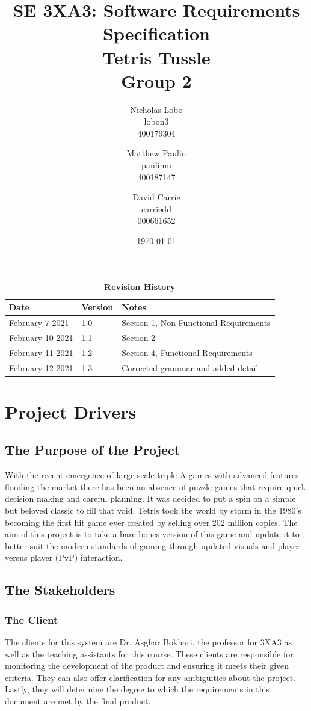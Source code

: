 \documentclass[12pt, titlepage]{article}
\title{\textbf{SE 3XA3: Software Requirements Specification} \\
    \large{Tetris Tussle \\ Group 2}
}
\author{
    Nicholas Lobo \\ lobon3 \\ 400179304 \and
	Matthew Paulin \\ paulinm \\ 400187147 \and
	David Carrie \\ carriedd \\ 000661652 \and
}
\date{\today}
\begin{document}
\maketitle

\tableofcontents
\listoftables
\listoffigures

\begin{table}[!ht]
\caption{\bf Revision History}
\begin{tabularx}{\textwidth}{p{3cm}p{2cm}X}
\toprule {\bf Date} & {\bf Version} & {\bf Notes}\\
\midrule
February 7 2021 & 1.0 & Section 1, Non-Functional Requirements\\
February 10 2021 & 1.1 & Section 2\\
February 11 2021 & 1.2 & Section 4, Functional Requirements \\
February 12 2021 & 1.3 & Corrected grammar and added detail\\
\bottomrule
\end{tabularx}
\end{table}

\newpage
{}

\section{Project Drivers}
\subsection{The Purpose of the Project}
With the recent emergence of large scale triple A games with advanced features flooding the market there has been an absence of puzzle games that require quick decision making and careful planning. It was decided to put a spin on a simple but beloved classic to fill that void. Tetris took the world by storm in the 1980’s becoming the first hit game ever created by selling over 202 million copies. The aim of this project is to take a bare bones version of this game and update it to better suit the modern standards of gaming through updated visuals and player versus player (PvP) interaction.
\subsection{The Stakeholders}
\subsubsection{The Client}
The clients for this system are Dr. Asghar Bokhari, the professor for 3XA3 as well as the teaching assistants for this course. These clients are responsible for monitoring the development of the product and ensuring it meets their given criteria. They can also offer clarification for any ambiguities about the project. Lastly, they will determine the degree to which the requirements in this document are met by the final product.
\end{document}
